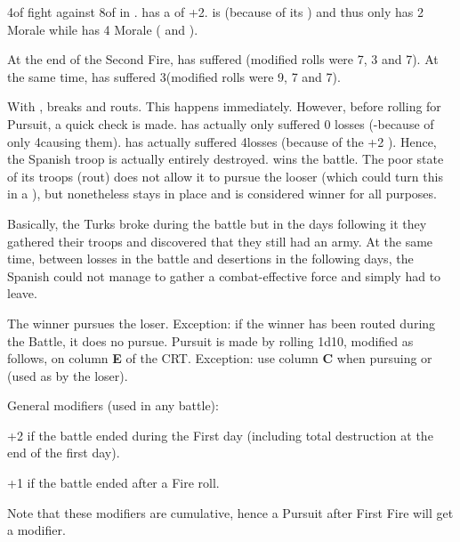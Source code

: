 \begin{exemple}[Destruction]
  4\LD of \HIS fight against 8\LD of \TUR in \TARQ. \TUR has a  of +2. \TUR is  (because of its \Timar) and
  thus only has 2 Morale while \HIS has 4 Morale ( and \TTER).

  At the end of the Second Fire, \TUR has suffered
  \texttd\textetoile\textetoile (modified \HIS rolls were 7, 3 and 7).  At the
  same time, \HIS has suffered 3\textetoile\textetoile\textetoile (modified
  \TUR rolls were 9, 7 and 7).

  With \textetoile\textetoile, \TUR breaks and routs. This happens
  immediately. However, before rolling for Pursuit, a quick check is
  made. \TUR has actually only suffered 0 losses (\texttd-\texttd because of
  only 4\LD causing them). \HIS has actually suffered 4\texttu losses (because
  of the +2 ). Hence, the Spanish troop is actually
  entirely destroyed. \TUR wins the battle. The poor state of its troops
  (rout) does not allow it to pursue the looser (which could turn this in a
  ), but \TUR nonetheless stays in place and is considered
  winner for all purposes.

  Basically, the Turks broke during the battle but in the days following it
  they gathered their troops and discovered that they still had an army. At
  the same time, between losses in the battle and desertions in the following
  days, the Spanish could not manage to gather a combat-effective force and
  simply had to leave.
\end{exemple}

The winner pursues the loser. Exception: if the winner has been routed during
the Battle, it does no pursue. Pursuit is made by rolling 1d10, modified as
follows, on column \textbf{E} of the CRT. Exception: use column \textbf{C}
when pursuing \NTD or \NGD (used as  by the loser).

General modifiers (used in any battle):
\begin{modlist}
\item[+2] if the battle ended during the First day (including total
  destruction at the end of the first day).
\item[+1] if the battle ended after a Fire roll.
\end{modlist}
Note that these modifiers are cumulative, hence a Pursuit after First Fire
will get a  modifier.

